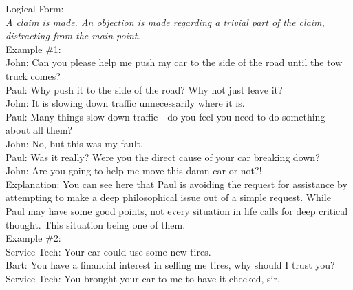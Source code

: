 \documentclass[a4paper,12pt,single,pdftex]{scrartcl}
\begin{document}
    
      Logical Form:{\it  \newline
}
    \\

    
      {\it A claim is made. \newline
An objection is made regarding a trivial part of the claim, distracting from the main point.}
    \\

    
      Example \#1:
    \\

    
      John: Can you please help me push my car to the side of the road until the tow truck comes?
    \\

    
      Paul: Why push it to the side of the road?  Why not just leave it?
    \\

    
      John: It is slowing down traffic unnecessarily where it is.
    \\

    
      Paul: Many things slow down traffic—do you feel you need to do something about all them?
    \\

    
      John: No, but this was my fault.
    \\

    
      Paul: Was it really? Were you the direct cause of your car breaking down?
    \\

    
      John: Are you going to help me move this damn car or not?!
    \\

    
      Explanation: You can see here that Paul is avoiding the request for assistance by attempting to make a deep philosophical issue out of a simple request.  While Paul may have some good points, not every situation in life calls for deep critical thought.  This situation being one of them.
    \\

    
      Example \#2:
    \\

    
      Service Tech: Your car could use some new tires.
    \\

    
      Bart: You have a financial interest in selling me tires, why should I trust you?
    \\

    
      Service Tech: You brought your car to me to have it checked, sir.
    \\
\end{document}
